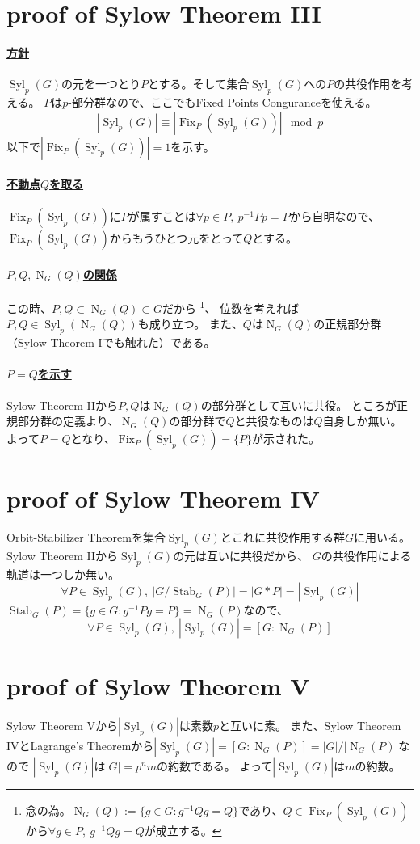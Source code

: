 \documentclass[a4paper]{jarticle}
\newcommand{\Stab}{\operatorname{Stab}}
\newcommand{\Fix}{\operatorname{Fix}}
\newcommand{\Norm}{\operatorname{N}}
\newcommand{\Syl}{\operatorname{Syl}}
\newcommand{\ulpar}[1]{\paragraph{\underline{#1}}}
\begin{document}
    \section{proof of Sylow Theorem III}
    \ulpar{方針}
    $\Syl_p(G)$の元を一つとり$P$とする。そして集合$\Syl_p(G)$への$P$の共役作用を考える。
    $P$は$p$-部分群なので、ここでもFixed Points Conguranceを使える。
    \[ |\Syl_p(G)| \equiv |\Fix_P(\Syl_p(G))| \mod p\]
    以下で$|\Fix_P(\Syl_p(G))|=1$を示す。

    \ulpar{不動点$Q$を取る}
    $\Fix_P(\Syl_p(G))$に$P$が属すことは$\forall p \in P,~ p^{-1}Pp=P$から自明なので、
    $\Fix_P(\Syl_p(G))$からもうひとつ元をとって$Q$とする。

    \ulpar{$P, Q, \Norm_G(Q)$の関係}
    この時、$P,Q \subset \Norm_G(Q) \subset G$だから
    \footnote{念の為。$\Norm_G(Q):=\{ g \in G : g^{-1}Qg=Q \}$であり、$Q \in \Fix_P(\Syl_p(G))$から$\forall g \in P,~ g^{-1}Qg=Q$が成立する。}、
    位数を考えれば$P,Q \in \Syl_p(\Norm_G(Q))$も成り立つ。
    また、$Q$は$\Norm_G(Q)$の正規部分群（Sylow Theorem Iでも触れた）である。

    \ulpar{$P=Q$を示す}
    Sylow Theorem IIから$P,Q$は$\Norm_G(Q)$の部分群として互いに共役。
    ところが正規部分群の定義より、$\Norm_G(Q)$の部分群で$Q$と共役なものは$Q$自身しか無い。
    よって$P=Q$となり、$\Fix_P(\Syl_p(G))=\{ P \}$が示された。
    

    \section{proof of Sylow Theorem IV}
    Orbit-Stabilizer Theoremを集合$\Syl_p(G)$とこれに共役作用する群$G$に用いる。
    Sylow Theorem IIから$\Syl_p(G)$の元は互いに共役だから、
    $G$の共役作用による軌道は一つしか無い。
    \[ \forall P \in \Syl_p(G),~ |G/\Stab_G(P)|=|G \ast P|=|\Syl_p(G)|\]
    $\Stab_G(P)=\{ g \in G : g^{-1}Pg=P \}=\Norm_G(P)$なので、
    \[ \forall P \in \Syl_p(G),~ |\Syl_p(G)|=[G:\Norm_G(P)] \]
    

    \section{proof of Sylow Theorem V}
    Sylow Theorem Vから$|\Syl_p(G)|$は素数$p$と互いに素。
    また、Sylow Theorem IVとLagrange's Theoremから$|\Syl_p(G)|=[G:\Norm_G(P)]=|G|/|\Norm_G(P)|$なので
    $|\Syl_p(G)|$は$|G|=p^n m$の約数である。
    よって$|\Syl_p(G)|$は$m$の約数。
    
\end{document}
